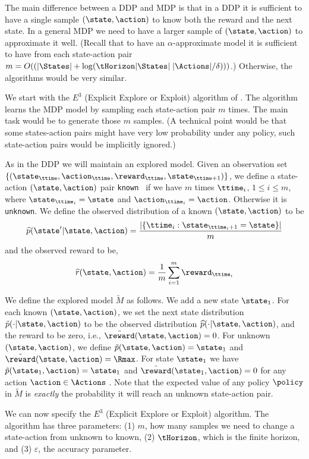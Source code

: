 The main difference between a DDP and MDP is that in a DDP it is
sufficient to have a single sample $(\state,\action)$ to know both
the reward and the next state. In a general MDP we need to have a
larger sample of $(\state,\action)$ to approximate it well. (Recall
that to have an $\alpha$-approximate model it is sufficient to have
from each state-action pair $m=O((|\States|+\log(\tHorizon
|\States|\;|\Actions|/\delta)))$.)
Otherwise, the algorithms would be very similar.

We start with the $E^3$ (Explicit Explore or Exploit) algorithm of
\cite{KearnsS02}. The algorithm learns the MDP model by sampling
each state-action pair $m$ times. The main task would be to generate
those $m$ samples. (A technical point would be that some
states-action pairs might have very low probability under any
policy, such state-action pairs would be implicitly ignored.)

As in the DDP we will maintain an explored model. Given an
observation set $\{(\state_\ttime,\action_\ttime ,\reward_\ttime,
\state_{\ttime+1})\}$, we define a state-action $(\state,\action)$
pair {\tt known } if we have $m$ times $\ttime_i$, $1\leq i \leq m$,
where $\state_{\ttime_i}=\state$ and $\action_{\ttime_i}=\action$.
Otherwise it is {\tt unknown}. We define the observed distribution
of a known $(\state,\action)$ to be
\[
\widehat{p}(\state'|\state,\action)= \frac{|\{\ttime_i
:\state_{\ttime_i+1}=\state\}|}{m}
\]
and the observed reward to be,
\[
\widehat{r}(\state,\action)=\frac{1}{m}\sum_{i=1}^m
\reward_{\ttime_i}
\]


We define the explored model $\tilde{M}$ as follows. We add a new
state $\state_1$. For each known $(\state,\action)$, we set the next
state distribution $\tilde{p}(\cdot|\state,\action)$ to be the
observed distribution $\widehat{p}(\cdot|\state,\action)$, and the
reward to be zero, i.e., $\tilde{\reward}(\state,\action)=0$.
%
For unknown $(\state,\action)$, we define
$\tilde{p}(\state,\action)=\state_1$ and
$\tilde{\reward}(\state,\action)=\Rmax$. For state $\state_1$ we
have $\tilde{p}(\state_1,\action)=\state_1$ and
$\tilde{\reward}(\state_1,\action)=0$ for any action
$\action\in\Actions$ .
%
Note that the expected value of any policy $\policy$ in $\tilde{M}$
is {\em exactly} the probability it will reach an unknown
state-action pair.

We can now specify the $E^3$ (Explicit Explore or Exploit)
algorithm. The algorithm has three parameters: (1) $m$, how many
samples we need to change a state-action from unknown to known, (2)
$\tHorizon$, which is the finite horizon, and (3) $\varepsilon$, the
accuracy parameter.

